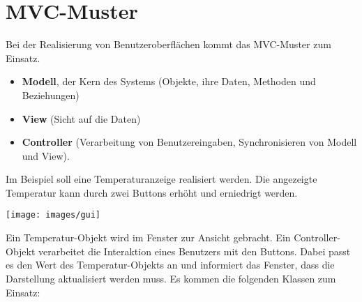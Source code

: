 \documentclass[11pt]{article}
\begin{document}
\section*{MVC-Muster}
Bei der Realisierung von Benutzeroberflächen kommt das MVC-Muster zum Einsatz.
\begin{itemize}
\item \textbf{Modell}, der Kern des Systems (Objekte, ihre Daten, Methoden und Beziehungen)
\item \textbf{View} (Sicht auf die Daten)
\item \textbf{Controller} (Verarbeitung von Benutzereingaben, Synchronisieren von Modell und View).
\end{itemize}
Im Beispiel soll eine Temperaturanzeige realisiert werden. Die angezeigte Temperatur kann durch zwei Buttons erhöht und erniedrigt werden.
\begin{center}
\texttt{[image: images/gui]}
\end{center}
Ein Temperatur-Objekt wird im Fenster zur Ansicht gebracht. Ein Controller-Objekt verarbeitet die Interaktion eines Benutzers mit den Buttons. Dabei passt es den Wert des Temperatur-Objekts an und informiert das Fenster, dass die Darstellung aktualisiert werden muss. Es kommen die folgenden Klassen zum Einsatz:
\begin{center}
\end{center}
\end{document}
